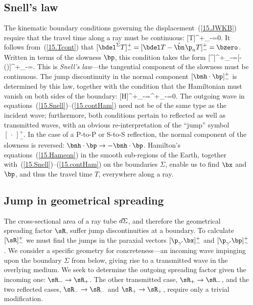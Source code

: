 \renewcommand{\thesubsection}{$\!\!\!\raise1.3ex\hbox{$\star$}\!\!$
\arabic{chapter}.\arabic{section}.\arabic{subsection}}
\subsection{Snell's law}
%
\renewcommand{\thesubsection}{\arabic{chapter}.\arabic{section}.\arabic{subsection}}

The kinematic boundary conditions governing the
displacement~(\ref{15.JWKB}) require that the travel
time along a ray must be continuous:
\eq \label{15.Tcont}
[T]^+_-=0.
\en
It follows from~(\ref{15.Tcont}) that $[\bdel^{\Sigma}T]^+_-
=[\bdel T-\hat{\bn}\hspace{0.2 mm}\p_nT]^+_-=\bzero$.  Written in terms of
the slowness $\bp$, this condition takes the form
\eq \label{15.Snell}
[\bp^{\Sigma}]^+_-=[\bp-\bnh(\bnh\cdot\bp)]^+_-=\bzero.
\en
This is {\em Snell's law\/}---the tangential component
of the slowness must be continuous.  The jump discontinuity
in the normal component $[\bnh\cdot\bp]^+_-$ is determined
by this law, together with the condition that the Hamiltonian
must vanish on both sides of the boundary:
\eq \label{15.contHam}
[H]^+_-=\half[\bp\cdot\bp-v^{-2}]^+_-=0.
\en
The outgoing wave in equations~(\ref{15.Snell})--(\ref{15.contHam}) need not be
of the same type as the incident wave; furthermore, both conditions
pertain to reflected as well as transmitted waves, with an obvious
re-interpretation of the ``jump'' symbol $[\,\cdot\,]^+_-$.  In the
case of a P-to-P or S-to-S reflection, the normal component of the slowness
is reversed: $\bnh\cdot\bp\rightarrow -\bnh\cdot\bp$.
Hamilton's equations~(\ref{15.Hameqn}) in the smooth sub-regions of the Earth,
together with~(\ref{15.Snell})--(\ref{15.contHam}) on the boundaries
$\Sigma$, enable us to find $\bx$ and $\bp$, and thus the travel
time $T$, everywhere along a ray.
%

\renewcommand{\thesubsection}{$\!\!\!\raise1.3ex\hbox{$\star$}\!\!$
\arabic{chapter}.\arabic{section}.\arabic{subsection}}
\subsection{Jump in geometrical spreading}
%
\renewcommand{\thesubsection}{\arabic{chapter}.\arabic{section}.\arabic{subsection}}

The cross-sectional area of a ray tube $d\/\Sigma$,
and therefore the geometrical spreading
factor $\sR$, suffer jump discontinuities
at a boundary.  To calculate $[\sR]^+_-$ we must find the jumps in the
paraxial vectors $[\p_{\gamma^{\prime}}\bx]^+_-$ and $[\p_{\gamma^{\prime}}
\bp]^+_-$.  We consider a specific geometry for concreteness---an incoming
wave impinging upon the boundary $\Sigma$ from below, giving rise to a
transmitted wave in the overlying medium.  We seek to determine
the outgoing spreading factor given the incoming one:
$\sR_-\rightarrow\sR_+$.  The other transmitted case,
$\sR_+\rightarrow\sR_-$, and the two reflected cases,
$\sR_-\rightarrow\sR_-$ and $\sR_+\rightarrow\sR_+$,
require only a trivial modification.

